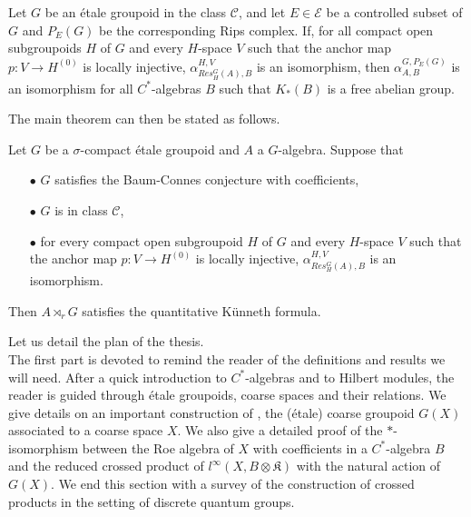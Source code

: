 \begin{itemize}
\begin{thm}
Let $G$ be an étale groupoid in the class $\mathcal C$, and let $E\in\mathcal E$ be a controlled subset of $G$ and $P_E(G)$ be the corresponding Rips complex. If, for all compact open subgroupoids $H$ of $G$ and every $H$-space $V$ such that the anchor map $p : V\rightarrow H^{(0)}$ is locally injective, $\alpha_{Res_H^G(A),B}^{H,V}$ is an isomorphism, then $\alpha_{A,B}^{G,P_E(G)}$ is an isomorphism for all $C^*$-algebras $B$ such that $K_*(B)$ is a free abelian group.\\
\end{thm}

The main theorem can then be stated as follows.\\

\begin{thm}
Let $G$ be a $\sigma$-compact étale groupoid and $A$ a $G$-algebra. Suppose that 
\begin{itemize}
\item[$\bullet$] $G$ satisfies the Baum-Connes conjecture with coefficients,
\item[$\bullet$] $G$ is in class $\mathcal C$,
\item[$\bullet$] for every compact open subgroupoid $H$ of $G$ and every $H$-space $V$ such that the anchor map $p : V \rightarrow H^{(0)}$ is locally injective, $\alpha_{Res_H^G(A),B}^{H,V}$ is an isomorphism.
\end{itemize} 
Then $A\rtimes_r G$ satisfies the quantitative Künneth formula.\\
\end{thm}

\end{itemize}


Let us detail the plan of the thesis.\\ 

The first part is devoted to remind the reader of the definitions and results we will need. After a quick introduction to $C^*$-algebras and to Hilbert modules, the reader is guided through étale groupoids, coarse spaces and their relations. We give details on an important construction of \cite{SkTuYu}, the (étale) coarse groupoid $G(X)$ associated to a coarse space $X$. We also give a detailed proof of the $*$-isomorphism between the Roe algebra of $X$ with coefficients in a $C^*$-algebra $B$ and the reduced crossed product of $l^\infty (X,B\otimes\mathfrak K)$ with the natural action of $G(X)$. We end this section with a survey of the construction of crossed products in the setting of discrete quantum groups.\\
 
